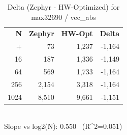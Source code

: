 \begin{table}[tb]
    \centering
    \caption{Delta (Zephyr - HW-Optimized) for max32690 / vec_abs}
    \label{tab:delta_max32690_vec_abs}
    \scriptsize
    \begin{tabular}{r r r r}
        \hline
        \textbf{N} & \textbf{Zephyr} & \textbf{HW-Opt} & \textbf{Delta} \\\n+        \hline
        4 & 73 & 1,237 & -1,164\\
        16 & 187 & 1,336 & -1,149\\
        64 & 569 & 1,733 & -1,164\\
        256 & 2,154 & 3,318 & -1,164\\
        1024 & 8,510 & 9,661 & -1,151\\
        \hline
    \end{tabular}
    \vspace{2mm}\\\n    Slope vs log2(N): 0.550 \ (R^2=0.051)\n\end{table}
